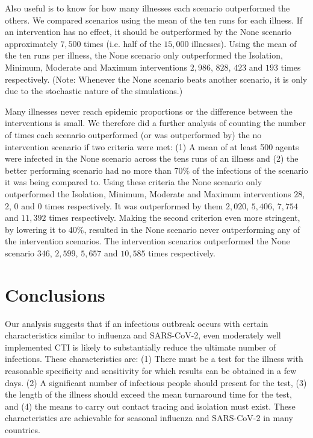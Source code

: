 \documentclass{article}
\begin{document}
Also useful is to know for how many illnesses each scenario outperformed the
others. We compared scenarios using the mean of the ten runs for each
illness. If an intervention has no effect, it should be outperformed by the None
scenario approximately $7,500$ times (i.e. half of the $15,000$
illnesses). Using the mean of the ten runs per illness, the None scenario only
outperformed the Isolation, Minimum, Moderate and Maximum interventions $2,986$,
$828$, $423$ and $193$ times respectively. (Note: Whenever the None scenario beats
another scenario, it is only due to the stochastic nature of the simulations.)

Many illnesses never reach epidemic proportions or the difference between the
interventions is small. We therefore did a further analysis of counting the
number of times each scenario outperformed (or was outperformed by) the no
intervention scenario if two criteria were met: (1) A mean of at least 500
agents were infected in the None scenario across the tens runs of an illness and
(2) the better performing scenario had no more than 70\% of the infections of
the scenario it was being compared to. Using these criteria the None scenario
only outperformed the Isolation, Minimum, Moderate and Maximum interventions $28$,
$2$, $0$ and $0$ times respectively. It was outperformed by them $2,020$, $5,406$,
$7,754$ and $11,392$ times respectively. Making the second criterion even more
stringent, by lowering it to 40\%, resulted in the None scenario never
outperforming any of the intervention scenarios. The intervention scenarios
outperformed the None scenario $346$, $2,599$, $5,657$ and $10,585$ times
respectively.

\section{Conclusions}\label{conclusions}

Our analysis suggests that if an infectious outbreak occurs with certain
characteristics similar to influenza and SARS-CoV-2, even moderately well
implemented CTI is likely to substantially reduce the ultimate
number of infections. These characteristics are: (1) There must be a test for
the illness with reasonable specificity and sensitivity for which results can be
obtained in a few days. (2) A significant number of infectious people should
present for the test, (3) the length of the illness should exceed the mean
turnaround time for the test, and (4) the means to carry out contact tracing and
isolation must exist. These characteristics are achievable for seasonal
influenza and SARS-CoV-2 in many countries.
\end{document}
